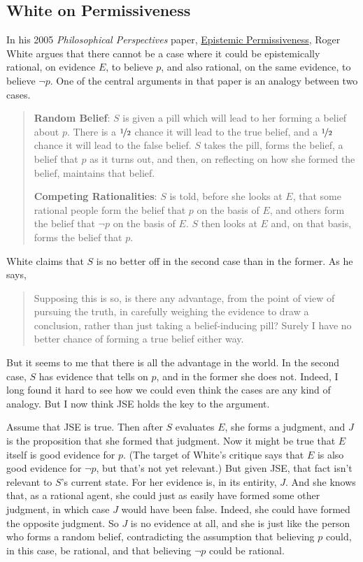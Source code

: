\subsection{White on Permissiveness}

In his 2005 \textit{Philosophical Perspectives} paper, \href{http://philosophy.fas.nyu.edu/docs/IO/1180/EP.pdf }{Epistemic Permissiveness}, Roger White argues that there cannot be a case where it could be epistemically rational, on evidence \(E\), to believe \(p\), and also rational, on the same evidence, to believe \(\neg p\). One of the central arguments in that paper is an analogy between two cases.

\begin{quote}
\textbf{Random Belief}: \(S\) is given a pill which will lead to her forming a belief about \(p\). There is a \(\nicefrac{1}{2}\) chance it will lead to the true belief, and a \(\nicefrac{1}{2}\) chance it will lead to the false belief. \(S\) takes the pill, forms the belief, a belief that \(p\) as it turns out, and then, on reflecting on how she formed the belief, maintains that belief.

\textbf{Competing Rationalities}: \(S\) is told, before she looks at \(E\), that some rational people form the belief that \(p\) on the basis of \(E\), and others form the belief that \(\neg p\) on the basis of \(E\). \(S\) then looks at \(E\) and, on that basis, forms the belief that \(p\).
\end{quote}

\noindent White claims that \(S\) is no better off in the second case than in the former. As he says,

\begin{quote}
Supposing this is so, is there any advantage, from the point of view of pursuing the truth, in carefully weighing the evidence to draw a conclusion, rather than just taking a belief-inducing pill? Surely I have no better chance of forming a true belief either way.
\end{quote}

\noindent But it seems to me that there is all the advantage in the world. In the second case, \(S\) has evidence that tells on \(p\), and in the former she does not. Indeed, I long found it hard to see how we could even think the cases are any kind of analogy. But I now think JSE holds the key to the argument.

Assume that JSE is true. Then after \(S\) evaluates \(E\), she forms a judgment, and \(J\) is the proposition that she formed that judgment. Now it might be true that \(E\) itself is good evidence for \(p\). (The target of White's critique says that \(E\) is also good evidence for \(\neg p\), but that's not yet relevant.) But given JSE, that fact isn't relevant to \(S\)'s current state. For her evidence is, in its entirity, \(J\). And she knows that, as a rational agent, she could just as easily have formed some other judgment, in which case \(J\) would have been false. Indeed, she could have formed the opposite judgment. So \(J\) is no evidence at all, and she is just like the person who forms a random belief, contradicting the assumption that believing \(p\) could, in this case, be rational, and that believing \(\neg p\) could be rational.

